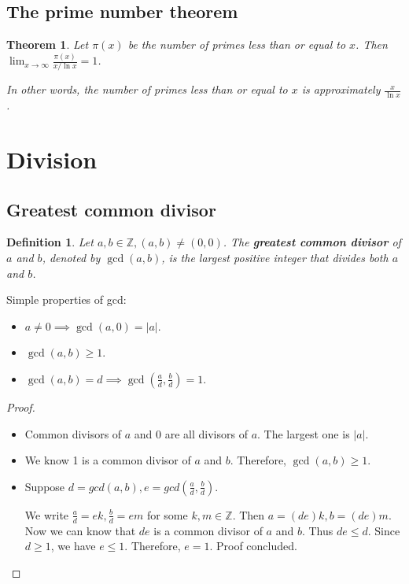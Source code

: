 \documentclass[letterpaper,12pt,oneside]{article}
\newtheorem{theorem}{Theorem}
\newtheorem{definition}{Definition}
\begin{document}
\subsection{The prime number theorem}
\begin{theorem}
    Let $\pi(x)$ be the number of primes less than or equal to $x$. Then $\lim_{x\to\infty} \frac{\pi(x)}{x/\ln x} = 1$.

    In other words, the number of primes less than or equal to $x$ is approximately
    $\frac{x}{\ln x}$.
\end{theorem}

\section{Division}
\subsection{Greatest common divisor}
\begin{definition}
    Let $a, b \in \mathbb{Z}, (a, b) \neq (0, 0)$. The \textbf{greatest common divisor} of $a$ and $b$, denoted by $\gcd(a, b)$, is the largest positive integer that divides both $a$ and $b$.
\end{definition}
Simple properties of gcd:\begin{itemize}
    \item $a\neq 0 \implies \gcd(a, 0) = |a|$.
    \item $\gcd(a, b)\ge 1$.
    \item $\gcd(a, b)=d \implies \gcd(\frac{a}{d},\frac{b}{d})=1$.
\end{itemize}
\begin{proof}
    \begin{itemize}
        \item Common divisors of $a$ and $0$ are all divisors of $a$. The largest one is
              $|a|$.
        \item We know 1 is a common divisor of $a$ and $b$. Therefore, $\gcd(a, b) \ge 1$.
        \item Suppose $d = gcd(a, b), e = gcd(\frac{a}{d}, \frac{b}{d})$.

              We write $\frac{a}{d} = ek, \frac{b}{d} = em$ for some $k, m \in \mathbb{Z}$.
              Then $a = (de)k, b = (de)m$. Now we can know that $de$ is a common divisor of
              $a$ and $b$. Thus $de \leq d$. Since $d \ge 1$, we have $e \leq 1$. Therefore,
              $e = 1$. Proof concluded.
    \end{itemize}
\end{proof}
\end{document}
